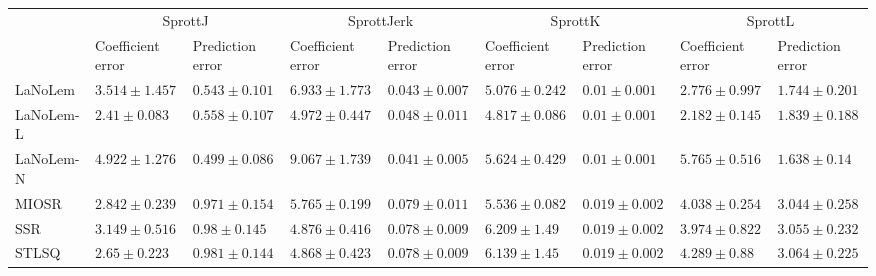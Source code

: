 \begin{table*}
{\begin{tabular}{lllllllll}
 & \multicolumn{2}{c}{SprottJ} & \multicolumn{2}{c}{SprottJerk} & \multicolumn{2}{c}{SprottK} & \multicolumn{2}{c}{SprottL} \\
 & Coefficient error & Prediction error & Coefficient error & Prediction error & Coefficient error & Prediction error & Coefficient error & Prediction error \\
\midrule
LaNoLem & $3.514\pm 1.457$ & $0.543\pm 0.101$ & $6.933\pm 1.773$ & $0.043\pm 0.007$ & $5.076\pm 0.242$ & $0.01\pm 0.001$ & $2.776\pm 0.997$ & $1.744\pm 0.201$ \\
LaNoLem-L & $\mathbf{2.41}\pm 0.083$ & $0.558\pm 0.107$ & $4.972\pm 0.447$ & $0.048\pm 0.011$ & $\mathbf{4.817}\pm 0.086$ & $0.01\pm 0.001$ & $\mathbf{2.182}\pm 0.145$ & $1.839\pm 0.188$ \\
LaNoLem-N & $4.922\pm 1.276$ & $\mathbf{0.499}\pm 0.086$ & $9.067\pm 1.739$ & $\mathbf{0.041}\pm 0.005$ & $5.624\pm 0.429$ & $\mathbf{0.01}\pm 0.001$ & $5.765\pm 0.516$ & $\mathbf{1.638}\pm 0.14$ \\
MIOSR & $2.842\pm 0.239$ & $0.971\pm 0.154$ & $5.765\pm 0.199$ & $0.079\pm 0.011$ & $5.536\pm 0.082$ & $0.019\pm 0.002$ & $4.038\pm 0.254$ & $3.044\pm 0.258$ \\
SSR & $3.149\pm 0.516$ & $0.98\pm 0.145$ & $4.876\pm 0.416$ & $0.078\pm 0.009$ & $6.209\pm 1.49$ & $0.019\pm 0.002$ & $3.974\pm 0.822$ & $3.055\pm 0.232$ \\
STLSQ & $2.65\pm 0.223$ & $0.981\pm 0.144$ & $\mathbf{4.868}\pm 0.423$ & $0.078\pm 0.009$ & $6.139\pm 1.45$ & $0.019\pm 0.002$ & $4.289\pm 0.88$ & $3.064\pm 0.225$ \\

\midrule


\end{tabular}}
\end{table*}
